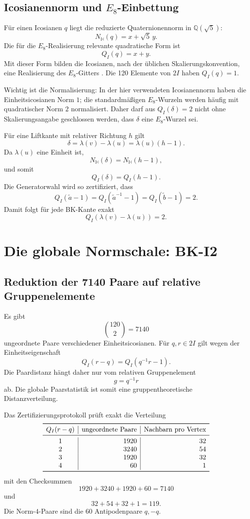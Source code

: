 \documentclass[11pt,a4paper]{article}
\theoremstyle{definition}
\newcommand{\twoI}{2I}
\newcommand{\QI}{Q_I}
\begin{document}
\subsection{Icosianennorm und \(E_8\)-Einbettung}

Für einen Icosianen \(q\) liegt die reduzierte Quaternionennorm in
\(\mathbb Q(\sqrt5)\):
\[
N_{\mathbb H}(q)=x+\sqrt5\,y.
\]
Die für die \(E_8\)-Realisierung relevante quadratische Form ist
\[
\QI(q)=x+y.
\]
Mit dieser Form bilden die Icosianen, nach der üblichen Skalierungskonvention, eine Realisierung des \(E_8\)-Gitters \cite{Baez2018}. Die 120 Elemente von \(\twoI\) haben \(\QI(q)=1\).

Wichtig ist die Normalisierung: In der hier verwendeten Icosianennorm haben die Einheitsicosianen Norm \(1\); die standardmäßigen \(E_8\)-Wurzeln werden häufig mit quadratischer Norm \(2\) normalisiert. Daher darf aus \(\QI(\delta)=2\) nicht ohne Skalierungsangabe geschlossen werden, dass \(\delta\) eine \(E_8\)-Wurzel sei.

Für eine Liftkante mit relativer Richtung \(h\) gilt
\[
\delta=\lambda(v)-\lambda(u)=\lambda(u)(h-1).
\]
Da \(\lambda(u)\) eine Einheit ist,
\[
N_{\mathbb H}(\delta)=N_{\mathbb H}(h-1),
\]
und somit
\[
\QI(\delta)=\QI(h-1).
\]
Die Generatorwahl wird so zertifiziert, dass
\[
\QI(\tilde a-1)=\QI(\tilde a^{-1}-1)
=\QI(\tilde b-1)=2.
\]
Damit folgt für jede BK-Kante exakt
\[
\boxed{\QI(\lambda(v)-\lambda(u))=2.}
\]

\section{Die globale Normschale: BK-I2}

\subsection{Reduktion der 7140 Paare auf relative Gruppenelemente}

Es gibt
\[
\binom{120}{2}=7140
\]
ungeordnete Paare verschiedener Einheitsicosianen. Für \(q,r\in\twoI\) gilt wegen der Einheitseigenschaft
\[
\QI(r-q)=\QI(q^{-1}r-1).
\]
Die Paardistanz hängt daher nur vom relativen Gruppenelement
\[
g=q^{-1}r
\]
ab. Die globale Paarstatistik ist somit eine gruppentheoretische Distanzverteilung.

Das Zertifizierungsprotokoll prüft exakt die Verteilung
\[
\begin{array}{c|r|r}
\toprule
\QI(r-q) & \text{ungeordnete Paare} & \text{Nachbarn pro Vertex}\\
\midrule
1 & 1920 & 32\\
2 & 3240 & 54\\
3 & 1920 & 32\\
4 & 60 & 1\\
\bottomrule
\end{array}
\]
mit den Checksummen
\[
1920+3240+1920+60=7140
\]
und
\[
32+54+32+1=119.
\]
Die Norm-\(4\)-Paare sind die 60 Antipodenpaare \(q,-q\).
\end{document}
